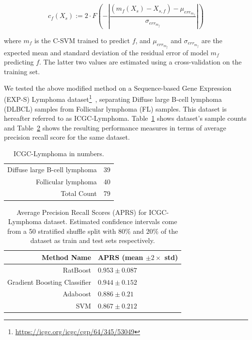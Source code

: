\begin{equation}
c_f(X_s) := 2 \cdot F\left(-\left| \frac{(m_f(X_s) - X_{s,f}) - \mu_{err_{m_f}}}{\sigma_{err_{m_f}}}\right|\right)
\label{frm:ratboost:feature-confidence-csvm}
\end{equation}

where $m_f$ is the C-SVM trained to predict $f$, and $\mu_{err_{m_f}}$ and $\sigma_{err_{m_f}}$ are the expected mean and standard deviation of the residual error of model $m_f$ predicting $f$. The latter two values are estimated using a cross-validation on the training set.

We tested the above modified method on a Sequence-based Gene Expression (EXP-S) Lymphoma dataset\footnote{\url{https://icgc.org/icgc/cgp/64/345/53049}}~\cite{richter2012recurrent}, separating Diffuse large B-cell lymphoma (DLBCL) samples from Follicular lymphoma (FL) samples. This dataset is hereafter referred to as ICGC-Lymphoma. Table~\ref{tbl:ratboost2-icgc-lymphoma-dataset} shows dataset's sample counts and Table~\ref{tbl:ratboost2-performance} shows the resulting performance measures in terms of average precision recall score for the same dataset. 

\begin{table}[!ht]
  \centering
  \begin{tabular}{rc}
    Diffuse large B-cell lymphoma & 39 \\
    Follicular lymphoma & 40 \\
    Total Count & 79 \\
  \end{tabular}
  \caption{ICGC-Lymphoma in numbers.}
  \label{tbl:ratboost2-icgc-lymphoma-dataset}
\end{table}

\begin{table}[!ht]
  \centering
  \begin{tabular}{rl}
    Method Name & APRS (mean $\pm 2 \times$ std) \\ \hline
    RatBoost & $0.953 \pm 0.087$ \\
    Gradient Boosting Classifier & $0.944 \pm 0.152$ \\
    Adaboost & $0.886 \pm 0.21$ \\
    SVM & $0.867 \pm 0.212$ \\ \hline
  \end{tabular}
  \caption{Average Precision Recall Scores (APRS) for ICGC-Lymphoma dataset. Estimated confidence intervals come from a 50 stratified shuffle split with $80\%$ and $20\%$ of the dataset as train and test sets respectively.}
  \label{tbl:ratboost2-performance}
\end{table}

